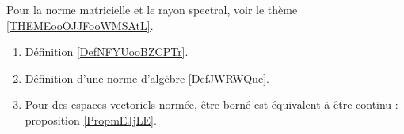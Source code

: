 
         \label{THEMEooHSLLooBQpFAr}
    Pour la norme matricielle et le rayon spectral, voir le thème \ref{THEMEooOJJFooWMSAtL}.
    \begin{enumerate}
        \item
            Définition \ref{DefNFYUooBZCPTr}.
        \item 
            Définition d'une norme d'algèbre \ref{DefJWRWQue}.
        \item
            Pour des espaces vectoriels normée, être borné est équivalent à être continu : proposition \ref{PropmEJjLE}.
    \end{enumerate}

